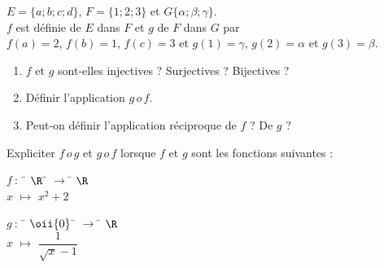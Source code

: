 \documentclass[a4paper,11pt]{article}
\begin{document}
\exo{}

$E=\{a;b;c;d\}$, $F=\{1;2;3\}$ et $G\{\alpha;\beta;\gamma\}$.\\
$f$ est définie de $E$ dans $F$  et $g$ de $F$ dans $G$ par\\
$f(a)=2$, $f(b)=1$, $f(c)=3$ et $g(1)=\gamma$, $g(2)=\alpha$ et $g(3)=\beta$.

\begin{enumerate}[\bfseries 1.]
	\item 	$f$ et $g$ sont-elles injectives ? Surjectives ? Bijectives ?
	\item 	Définir l'application $g\, o\, f$.
	\item 	Peut-on définir l'application réciproque de $f$ ? De $g$ ?
\end{enumerate}

\exo{*}

Expliciter  $f\,o\, g$ et $g\,o\, f$ lorsque $f$ et $g$ 
sont les fonctions suivantes :
\begin{multicols}{2}
\begin{tabbing}
$f\ :\ $	\=	$\R$	\=	$\longrightarrow$	\=	$\R$\\
		\>	$x$		\> 	$\longmapsto$		\>	$x^2+2$
\end{tabbing}
\begin{tabbing}
$g\ :\ $	\=	$\oii{0}$	\=	$\longrightarrow$	\=	$\R$\\
			\>	$x$		\> 	$\longmapsto$		\>	$\dfrac{1}{\sqrt{x}-1}$
\end{tabbing}
\end{multicols}
\end{document}
